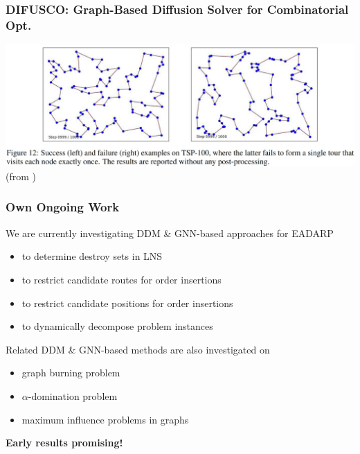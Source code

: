 \documentclass[aspectratio=1610]{beamer}
\newcommand{\important}[1]{{\color{green!60!black}#1}}
\begin{document}
\begin{frame}
	\frametitle{DIFUSCO: Graph-Based Diffusion Solver for Combinatorial Opt.}

	\begin{center}
		\includegraphics[width=\textwidth]{graphics/difusco2.jpg}
		(from \citet{sun-23})
	\end{center}
\end{frame}


\begin{frame}
	\frametitle{Own Ongoing Work}
	We are currently investigating \important{DDM \& GNN-based approaches for EADARP} 
		\begin{itemize}
			\item to determine destroy sets in LNS
			\item to restrict candidate routes for order insertions
			\item to restrict candidate positions for order insertions
			\item to dynamically decompose problem instances
		\end{itemize}
	
	\bigskip
	Related DDM \& GNN-based methods are also investigated on
	\begin{itemize}
		\item graph burning problem
		\item $\alpha$-domination problem
		\item maximum influence problems in graphs
	\end{itemize}
	
	\bigskip
	\important{\bf Early results promising!}
\end{frame}
\end{document}
